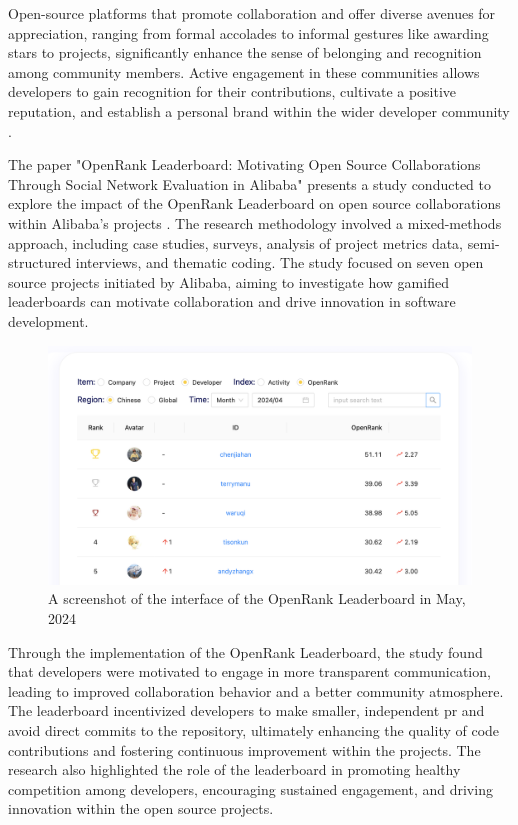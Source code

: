Open-source platforms that promote collaboration and offer diverse avenues for appreciation, ranging from formal accolades to informal gestures like awarding stars to projects, significantly enhance the sense of belonging and recognition among community members. Active engagement in these communities allows developers to gain recognition for their contributions, cultivate a positive reputation, and establish a personal brand within the wider developer community \cite{11gerosa2021shifting,13li2012leadership}.

The paper "OpenRank Leaderboard: Motivating Open Source Collaborations Through Social Network Evaluation in Alibaba" presents a study conducted to explore the impact of the OpenRank Leaderboard on open source collaborations within Alibaba's projects \cite{07zhao2024openrank}. The research methodology involved a mixed-methods approach, including case studies, surveys, analysis of project metrics data, semi-structured interviews, and thematic coding. The study focused on seven open source projects initiated by Alibaba, aiming to investigate how gamified leaderboards can motivate collaboration and drive innovation in software development.

\begin{figure}[ht]
    \centering
    \includegraphics[width=0.85\linewidth]{figs/openrank.png}
    \caption{A screenshot of the interface of the OpenRank Leaderboard in May, 2024}
    \label{fig:openrank}
\end{figure}



Through the implementation of the OpenRank Leaderboard, the study found that developers were motivated to engage in more transparent communication, leading to improved collaboration behavior and a better community atmosphere. The leaderboard incentivized developers to make smaller, independent \ac{pr} and avoid direct commits to the repository, ultimately enhancing the quality of code contributions and fostering continuous improvement within the projects. The research also highlighted the role of the leaderboard in promoting healthy competition among developers, encouraging sustained engagement, and driving innovation within the open source projects.

